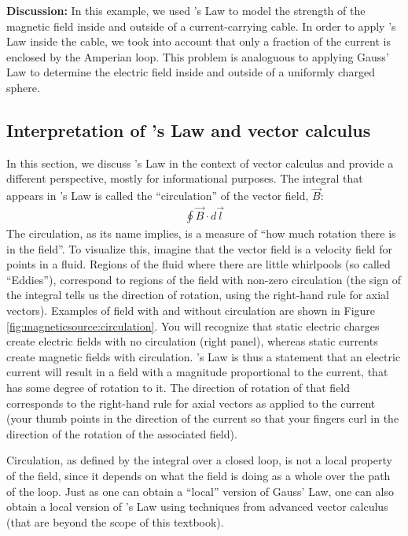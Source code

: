 \begin{example}
\textbf{Discussion:} In this example, we used \ampere's Law to model the strength of the magnetic field inside and outside of a current-carrying cable. In order to apply \ampere's Law inside the cable, we took into account that only a fraction of the current is enclosed by the Amperian loop. This problem is analoguous to applying Gauss' Law to determine the electric field inside and outside of a uniformly charged sphere. 
\end{example}

\subsection{Interpretation of \ampere's Law and vector calculus} 
\label{sec:magneticsource:interpretation}
In this section, we discuss \ampere's Law in the context of vector calculus and provide a different perspective, mostly for informational purposes. The integral that appears in \ampere's Law is called the ``circulation'' of the vector field, $\vec B$:
\begin{align*}
\oint \vec B \cdot d\vec l
\end{align*}
The circulation, as its name implies, is a measure of ``how much rotation there is in the field''. To visualize this, imagine that the vector field is a velocity field for points in a fluid. Regions of the fluid where there are little whirlpools (so called ``Eddies''), correspond to regions of the field with non-zero circulation (the sign of the integral tells us the direction of rotation, using the right-hand rule for axial vectors). Examples of field with and without circulation are shown in Figure \ref{fig:magneticsource:circulation}. You will recognize that static electric charges create electric fields with no circulation (right panel), whereas static currents create magnetic fields with circulation.
\ampere's Law is thus a statement that an electric current will result in a field with a magnitude proportional to the current, that has some degree of rotation to it. The direction of rotation of that field corresponds to the right-hand rule for axial vectors as applied to the current (your thumb points in the direction of the current so that your fingers curl in the direction of the rotation of the associated field). 

Circulation, as defined by the integral over a closed loop, is not a local property of the field, since it depends on what the field is doing as a whole over the path of the loop. Just as one can obtain a ``local'' version of  Gauss' Law, one can also obtain a local version of \ampere's Law using techniques from advanced vector calculus (that are beyond the scope of this textbook).

